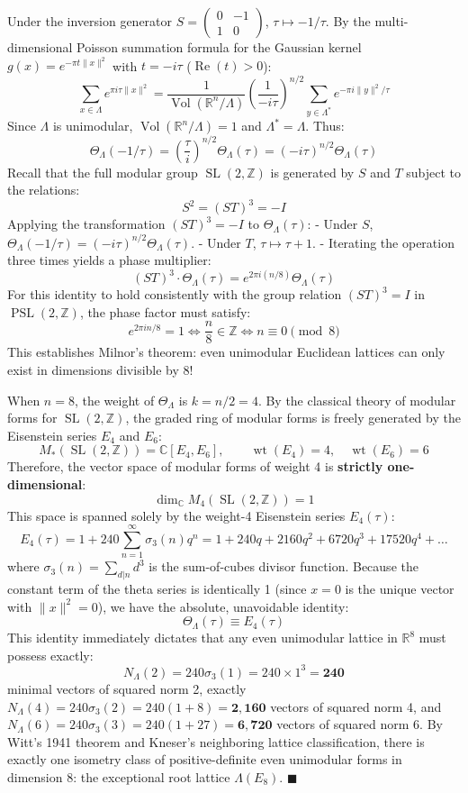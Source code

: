 \documentclass[11pt,twoside,openright]{amsbook}
\begin{document}
Under the inversion generator $S = \begin{pmatrix} 0 & -1 \\ 1 & 0 \end{pmatrix}$, $\tau \mapsto -1/\tau$. By the multi-dimensional Poisson summation formula for the Gaussian kernel $g(x) = e^{-\pi t \|x\|^2}$ with $t = -i\tau$ ($\operatorname{Re}(t) > 0$):
$$\sum_{x \in \Lambda} e^{\pi i \tau \|x\|^2} = \frac{1}{\operatorname{Vol}(\mathbb{R}^n / \Lambda)} \left( \frac{1}{-i\tau} \right)^{n/2} \sum_{y \in \Lambda^*} e^{-\pi i \|y\|^2 / \tau}$$
Since $\Lambda$ is unimodular, $\operatorname{Vol}(\mathbb{R}^n / \Lambda) = 1$ and $\Lambda^* = \Lambda$. Thus:
$$\Theta_\Lambda(-1/\tau) = \left( \frac{\tau}{i} \right)^{n/2} \Theta_\Lambda(\tau) = (-i\tau)^{n/2} \Theta_\Lambda(\tau)$$
Recall that the full modular group $\operatorname{SL}(2, \mathbb{Z})$ is generated by $S$ and $T$ subject to the relations:
$$S^2 = (ST)^3 = -I$$
Applying the transformation $(ST)^3 = -I$ to $\Theta_\Lambda(\tau)$:
- Under $S$, $\Theta_\Lambda(-1/\tau) = (-i\tau)^{n/2} \Theta_\Lambda(\tau)$.
- Under $T$, $\tau \mapsto \tau + 1$.
- Iterating the operation three times yields a phase multiplier:
$$(ST)^3 \cdot \Theta_\Lambda(\tau) = e^{2\pi i (n / 8)} \Theta_\Lambda(\tau)$$
For this identity to hold consistently with the group relation $(ST)^3 = I$ in $\operatorname{PSL}(2, \mathbb{Z})$, the phase factor must satisfy:
$$e^{2\pi i n / 8} = 1 \iff \frac{n}{8} \in \mathbb{Z} \iff n \equiv 0 \pmod 8$$
This establishes Milnor's theorem: even unimodular Euclidean lattices can only exist in dimensions divisible by 8!

When $n = 8$, the weight of $\Theta_\Lambda$ is $k = n/2 = 4$. By the classical theory of modular forms for $\operatorname{SL}(2, \mathbb{Z})$, the graded ring of modular forms is freely generated by the Eisenstein series $E_4$ and $E_6$:
$$M_*(\operatorname{SL}(2, \mathbb{Z})) = \mathbb{C}[E_4, E_6], \qquad \operatorname{wt}(E_4) = 4, \quad \operatorname{wt}(E_6) = 6$$
Therefore, the vector space of modular forms of weight 4 is \textbf{strictly one-dimensional}:
$$\dim_{\mathbb{C}} M_4(\operatorname{SL}(2, \mathbb{Z})) = 1$$
This space is spanned solely by the weight-4 Eisenstein series $E_4(\tau)$:
$$E_4(\tau) = 1 + 240 \sum_{n=1}^\infty \sigma_3(n) q^n = 1 + 240 q + 2160 q^2 + 6720 q^3 + 17520 q^4 + \dots$$
where $\sigma_3(n) = \sum_{d | n} d^3$ is the sum-of-cubes divisor function.
Because the constant term of the theta series is identically 1 (since $x = 0$ is the unique vector with $\|x\|^2 = 0$), we have the absolute, unavoidable identity:
$$\Theta_\Lambda(\tau) \equiv E_4(\tau)$$
This identity immediately dictates that any even unimodular lattice in $\mathbb{R}^8$ must possess exactly:
$$N_\Lambda(2) = 240 \sigma_3(1) = 240 \times 1^3 = \mathbf{240}$$
minimal vectors of squared norm 2, exactly $N_\Lambda(4) = 240 \sigma_3(2) = 240(1 + 8) = \mathbf{2,160}$ vectors of squared norm 4, and $N_\Lambda(6) = 240 \sigma_3(3) = 240(1 + 27) = \mathbf{6,720}$ vectors of squared norm 6.
By Witt's 1941 theorem and Kneser's neighboring lattice classification, there is exactly one isometry class of positive-definite even unimodular forms in dimension 8: the exceptional root lattice $\Lambda(E_8)$. $\blacksquare$
\end{document}
